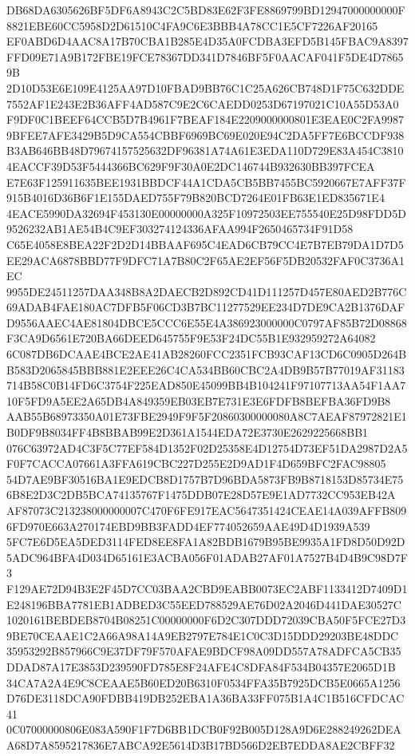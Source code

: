 \documentclass[UTF8,fontset=fandol,zihao=-4,a4paper]{ctexart}
\begin{document}
{{DB68DA6305626BF5DF6A8943C2C5BD83E62F3FE8869799BD12947000000000F8821EBE60CC5958D2D61510C4FA9C6E3BBB4A78CC1E5CF7226AF20165
EF0ABD6D4AAC8A17B70CBA1B285E4D35A0FCDBA3EFD5B145FBAC9A8397FFD09E71A9B172FBE19FCE78367DD341D7846BF5F0AACAF041F5DE4D78659B
2D10D53E6E109E4125AA97D10FBAD9BB76C1C25A626CB748D1F75C632DDE7552AF1E243E2B36AFF4AD587C9E2C6CAEDD0253D67197021C10A55D53A0
F9DF0C1BEEF64CCB5D7B4961F7BEAF184E2209000000801E3EAE0C2FA99879BFEE7AFE3429B5D9CA554CBBF6969BC69E020E94C2DA5FF7E6BCCDF938
B3AB646BB48D79674157525632DF96381A74A61E3EDA110D729E83A454C38104EACCF39D53F5444366BC629F9F30A0E2DC146744B932630BB397FCEA
E7E63F125911635BEE1931BBDCF44A1CDA5CB5BB7455BC5920667E7AFF37F915B4016D36B6F1E155DAED755F79B820BCD7264E01FB63E1ED835671E4
4EACE5990DA32694F453130E00000000A325F10972503EE755540E25D98FDD5D9526232AB1AE54B4C9EF303274124336AFAA994F2650465734F91D58
C65E4058E8BEA22F2D2D14BBAAF695C4EAD6CB79CC4E7B7EB79DA1D7D5EE29ACA6878BBD77F9DFC71A7B80C2F65AE2EF56F5DB20532FAF0C3736A1EC
9955DE24511257DAA348B8A2DAECB2D892CD41D111257D457E80AED2B776C69ADAB4FAE180AC7DFB5F06CD3B7BC11277529EE234D7DE9CA2B1376DAF
D9556AAEC4AE81804DBCE5CCC6E55E4A386923000000C0797AF85B72D08868F3CA9D6561E720BA66DEED645755F9E53F24DC55B1E932959272A64082
6C087DB6DCAAE4BCE2AE41AB28260FCC2351FCB93CAF13CD6C0905D264BB583D2065845BBB881E2EEE26C4CA534BB60CBC2A4DB9B57B77019AF31183
714B58C0B14FD6C3754F225EAD850E45099BB4B104241F97107713AA54F1AA710F5FD9A5EE2A65DB4A849359EB03EB7E731E3E6FDFB8BEFBA36FD9B8
AAB55B68973350A01E73FBE2949F9F5F20860300000080A8C7AEAF87972821E1B0DF9B8034FF4B8BBAB99E2D361A1544EDA72E3730E2629225668BB1
076C63972AD4C3F5C77EF584D1352F02D25358E4D12754D73EF51DA2987D2A5F0F7CACCA07661A3FFA619CBC227D255E2D9AD1F4D659BFC2FAC98805
54D7AE9BF30516BA1E9EDCB8D1757B7D96BDA5873FB9B8718153D85734E756B8E2D3C2DB5BCA74135767F1475DDB07E28D57E9E1AD7732CC953EB42A
AF87073C213238000000007C470F6FE917EAC5647351424CEAE14A039AFFB8096FD970E663A270174EBD9BB3FADD4EF774052659AAE49D4D1939A539
5FC7E6D5EA5DED3114FED8EE8FA1A82BDB1679B95BE9935A1FD8D50D92D5ADC964BFA4D034D65161E3ACBA056F01ADAB27AF01A7527B4D4B9C98D7F3
F129AE72D94B3E2F45D7CC03BAA2CBD9EABB0073EC2ABF1133412D7409D1E248196BBA7781EB1ADBED3C55EED788529AE76D02A2046D441DAE30527C
1020161BEBDEB8704B08251C00000000F6D2C307DDD72039CBA50F5FCE27D39BE70CEAAE1C2A66A98A14A9EB2797E784E1C0C3D15DDD29203BE48DDC
35953292B857966C9E37DF79F570AFAE9BDCF98A09DD557A78ADFCA5CB35DDAD87A17E3853D239590FD785E8F24AFE4C8DFA84F534B04357E2065D1B
34CA7A2A4E9C8CEAAE5B60ED20B6310F0534FFA35B7925DCB5E0665A1256D76DE3118DCA90FDBB419DB252EBA1A36BA33FF075B1A4C1B516CFDCAC41
0C07000000806E083A590F1F7D6BB1DCB0F92B005D128A9D6E288249262DEAA68D7A8595217836E7ABCA92E5614D3B17BD566D2EB7EDDA8AE2CBFF32
}}
\end{document}
